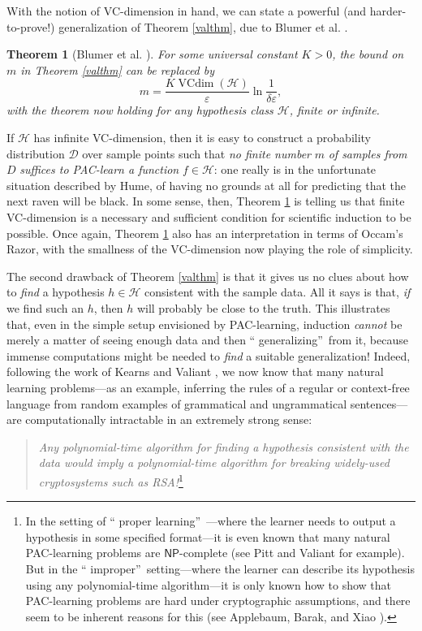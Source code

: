 \documentclass[12pt,onecolumn]{article}%
\newtheorem{theorem}{Theorem}
\begin{document}
With the notion of VC-dimension in hand, we can state a powerful (and
harder-to-prove!) generalization of Theorem \ref{valthm}, due to Blumer et
al. \cite{behw}.

\begin{theorem}
[Blumer et al. \cite{behw}]\label{vcthm}For some universal constant $K>0$,
the bound on $m$ in Theorem \ref{valthm} can be replaced by%
\[
m=\frac{K\operatorname*{VCdim}\left(  \mathcal{H}\right)  }{\varepsilon}%
\ln\frac{1}{\delta\varepsilon},
\]
with the theorem now holding for any hypothesis class $\mathcal{H}$, finite or infinite.
\end{theorem}

If $\mathcal{H}$ has infinite VC-dimension, then it is easy to construct a
probability distribution $\mathcal{D}$ over sample points such that
\textit{no finite number }$m$\textit{ of samples from }$D$\textit{ suffices
to PAC-learn a function} $f\in\mathcal{H}$: one really is in the unfortunate
situation described by Hume, of having no grounds at all for predicting that
the next raven will be black. In some sense, then, Theorem \ref{vcthm} is
telling us that finite VC-dimension is a necessary and sufficient condition
for scientific induction to be possible. Once again, Theorem \ref{vcthm}
 also has an interpretation in terms of Occam's Razor, with the smallness of
the VC-dimension now playing the role of simplicity.

The second drawback of Theorem \ref{valthm} is that it gives us no clues
about how to \textit{find} a hypothesis $h\in\mathcal{H}$ consistent with the
sample data. All it says is that, \textit{if} we find such an $h$, then $h$
will probably be close to the truth. This illustrates that, even in the
simple setup envisioned by PAC-learning, induction \textit{cannot} be merely a
matter of seeing enough data and then \textquotedblleft
generalizing\textquotedblright\  from it, because immense computations might be
needed to \textit{find} a suitable generalization! Indeed, following the
work of Kearns and Valiant \cite{kv}, we now know that many natural learning
problems---as an example, inferring the rules of a regular or context-free
language from random examples of grammatical and ungrammatical sentences---are
computationally intractable in an extremely strong sense:

\begin{quotation}
\noindent\textit{Any polynomial-time algorithm for finding a hypothesis consistent with
the data would imply a polynomial-time algorithm for breaking widely-used
cryptosystems such as RSA!}\footnote{In the setting of \textquotedblleft
proper learning\textquotedblright\ ---where the learner needs to output a
hypothesis in some specified format---it is even known that many natural
PAC-learning problems are $\mathsf{NP}$-complete (see Pitt and Valiant
\cite{pittvaliant} for example). But in the \textquotedblleft
improper\textquotedblright\  setting---where the learner can describe its
hypothesis using any polynomial-time algorithm---it is only known how to show
that PAC-learning problems are hard under cryptographic assumptions, and there
seem to be inherent reasons for this (see Applebaum, Barak, and Xiao
\cite{abx}).}
\end{quotation}
\end{document}
